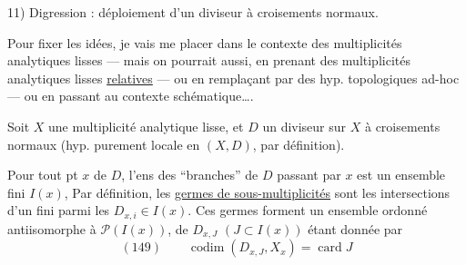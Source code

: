 11) Digression : déploiement d'un diviseur à croisements normaux.

Pour fixer les idées, je vais me placer dans le contexte des multiplicités analytiques lisses — mais on pourrait aussi, en prenant des multiplicités analytiques lisses \uline{relatives} — ou en remplaçant   par des hyp. topologiques ad-hoc — ou en passant au contexte schématique\ldots.

Soit $X$ une multiplicité analytique lisse, et $D$ un diviseur sur $X$ à croisements normaux (hyp. purement locale en $(X,D)$, par définition). 

Pour tout pt $x$ de $D$, l'ens des ``branches'' de $D$ passant par $x$ est un ensemble fini $I(x)$, Par définition, les \uline{germes  de sous-multiplicités}   sont les intersections d'un  fini  parmi les $D_{x,i}\in I(x)$.
Ces germes forment un ensemble ordonné  antiisomorphe à $\mathcal P(I(x))$,   de $D_{x,J}$ $(J\subset I(x))$ étant donnée par
\[
(149)\qquad \operatorname{codim}(D_{x,J},X_x)=\operatorname{card}J
\]
